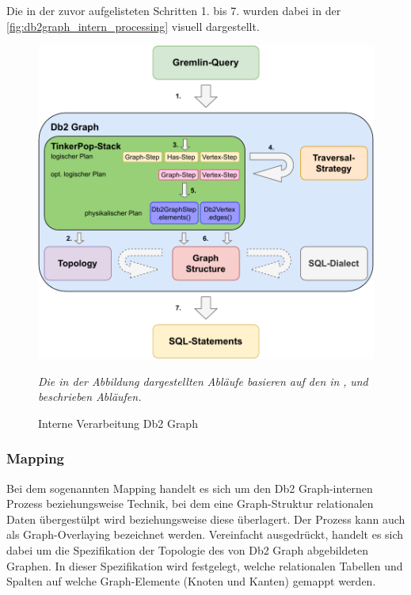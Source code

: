 Die in der zuvor aufgelisteten Schritten 1. bis 7. wurden dabei in der \autoref{fig:db2graph_intern_processing} visuell dargestellt.

\begin{figure}[ht]
    \centering
    \includegraphics[width=\textwidth]{images/db2graph_intern_processing.pdf}
    \caption{Interne Verarbeitung Db2 Graph}
    \label{fig:db2graph_intern_processing}
    \vspace{1em}
    \textit{Die in der Abbildung dargestellten Abläufe basieren auf den in} \cite{yt_tian}\textit{,} \cite{vldb_tian} \textit{und} \cite{sigmod_tian} \textit{beschrieben Abläufen.} 
\end{figure}

\subsubsection{Mapping}
Bei dem sogenannten Mapping handelt es sich um den Db2 Graph-internen Prozess beziehungsweise Technik, bei dem eine Graph-Struktur relationalen Daten überge\-stülpt wird beziehungsweise diese überlagert. Der Prozess kann auch als Graph-Overlaying bezeichnet werden. Vereinfacht ausgedrückt, handelt es sich dabei um die Spezifikation der Topologie des von Db2 Graph abgebildeten Graphen. In dieser Spezifikation wird festgelegt, welche relationalen Tabellen und Spalten auf welche Graph-Elemente (Knoten und Kanten) gemappt werden. 

